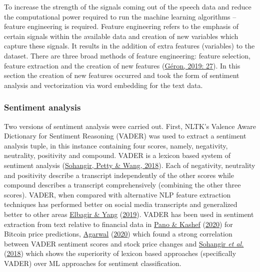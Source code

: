 \documentclass[11pt,preprint, authoryear]{elsarticle}
\numberwithin{equation}{section}
\numberwithin{figure}{section}
\numberwithin{table}{section}
\begin{document}
To increase the strength of the signals coming out of the speech data
and reduce the computational power required to run the machine learning
algorithms -- feature engineering is required. Feature engineering
refers to the emphasis of certain signals within the available data and
creation of new variables which capture these signals. It results in the
addition of extra features (variables) to the dataset. There are three
broad methods of feature engineering: feature selection, feature
extraction and the creation of new features
(\protect\hyperlink{ref-geron2019hands}{Géron, 2019: 27}). In this
section the creation of new features occurred and took the form of
sentiment analysis and vectorization via word embedding for the text
data.

\hypertarget{sentiment-analysis}{%
\subsubsection{Sentiment analysis}\label{sentiment-analysis}}

Two versions of sentiment analysis were carried out. First, NLTK's
Valence Aware Dictionary for Sentiment Reasoning (VADER) was used to
extract a sentiment analysis tuple, in this instance containing four
scores, namely, negativity, neutrality, positivity and compound. VADER
is a lexicon based system of sentiment analysis
(\protect\hyperlink{ref-sohangir2018financial}{Sohangir, Petty \& Wang,
2018}). Each of negativity, neutrality and positivity describe a
transcript independently of the other scores while compound describes a
transcript comprehensively (combining the other three scores). VADER,
when compared with alternative NLP feature extraction techniques has
performed better on social media transcripts and generalized better to
other areas \protect\hyperlink{ref-elbagir2019twitter}{Elbagir \& Yang}
(\protect\hyperlink{ref-elbagir2019twitter}{2019}). VADER has been used
in sentiment extraction from text relative to financial data in
\protect\hyperlink{ref-pano2020complete}{Pano \& Kashef}
(\protect\hyperlink{ref-pano2020complete}{2020}) for Bitcoin price
predictions, \protect\hyperlink{ref-agarwal2020sentiment}{Agarwal}
(\protect\hyperlink{ref-agarwal2020sentiment}{2020}) which found a
strong correlation between VADER sentiment scores and stock price
changes and \protect\hyperlink{ref-sohangir2018financial}{Sohangir
\emph{et al.}} (\protect\hyperlink{ref-sohangir2018financial}{2018})
which shows the superiority of lexicon based approaches (specifically
VADER) over ML approaches for sentiment classification.
\end{document}
